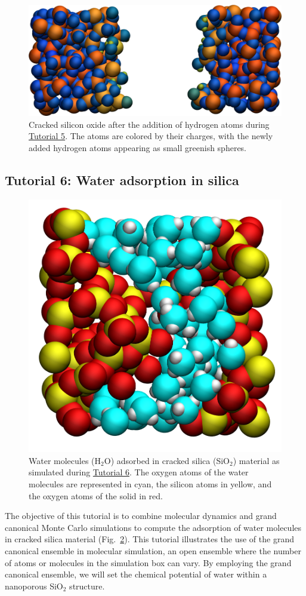 \documentclass[9pt,tutorial]{livecoms}
\begin{document}
\begin{figure}
\includegraphics[width=\linewidth]{SIO-decorated}
\caption{Cracked silicon oxide after the addition of hydrogen atoms
during \hyperref[reactive-silicon-dioxide-label]{Tutorial 5}.  The atoms
are colored by their charges, with the newly added hydrogen atoms appearing as small
greenish spheres.}
\label{fig:SIO-decorated}
\end{figure}

\subsection{Tutorial 6: Water adsorption in silica}
\label{gcmc-silica-label}

\begin{figure}
\centering
\includegraphics[width=0.6\linewidth]{GCMC}
\caption{Water molecules (H$_2$O) adsorbed in cracked silica (SiO$_2$) material as simulated
during \hyperref[gcmc-silica-label]{Tutorial 6}.  The oxygen atoms of the water
molecules are represented in cyan, the silicon atoms in yellow, and the oxygen
atoms of the solid in red.}
\label{fig:GCMC}
\end{figure}

\noindent The objective of this tutorial is to combine molecular dynamics and
grand canonical Monte Carlo simulations to compute the adsorption of water
molecules in cracked silica material (Fig.~\ref{fig:GCMC}).  This tutorial
illustrates the use of the grand canonical ensemble in molecular simulation, an
open ensemble where the number of atoms or molecules in the simulation box can vary.
By employing the grand canonical ensemble, we will set the chemical
potential of water within a nanoporous SiO$_2$ structure.
\end{document}

